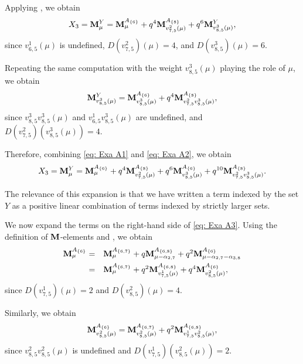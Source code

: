 \begin{example}
    Applying , we obtain
    \begin{equation}\label{eq: Exa A1}
        X_3= \mathbf{M}_{\mu}^{Y} = \mathbf{M}_\mu^{A_{\{6\}}} 
       +q^{4}\mathbf{M}_{v_{7,5}^2(\mu)}^{A_{\{8\}}}
        +q^{6}\mathbf{M}_{v_{8,5}^3 (\mu)}^{Y},
    \end{equation}
    since $v_{6,5}^1(\mu)$ is undefined, $D(v_{7,5}^2)(\mu)=4$, and $D(v_{8,5}^3 )(\mu)=6$. 

    Repeating the same computation with the weight $v_{8,5}^3(\mu)$ playing the role of $\mu$, we obtain
    \begin{equation}\label{eq: Exa A2}
        \mathbf{M}_{v_{8,5}^3(\mu)}^{Y} = \mathbf{M}_{v_{8,5}^3(\mu)}^{A_{\{6\}}} +q^4
        \mathbf{M}_{v_{7,5}^2v_{8,5}^3(\mu)}^{A_{\{8\}}}, 
    \end{equation}
    since $v_{8,5}^3v_{8,5}^3(\mu)$ and $v_{6,5}^1v_{8,5}^3(\mu)$ are undefined, and $D(v_{7,5}^2)(v_{8,5}^3(\mu))=4$.

    Therefore, combining \eqref{eq: Exa A1} and \eqref{eq: Exa A2}, we obtain
    \begin{equation}\label{eq: Exa A3}
        X_3=\mathbf{M}_{\mu}^{Y} = \mathbf{M}_\mu^{A_{\{6\}}} 
       +q^{4}\mathbf{M}_{v_{7,5}^2(\mu)}^{A_{\{8\}}}
        +q^{6}\mathbf{M}_{v_{8,5}^3(\mu)}^{A_{\{6\}}} +q^{10}
        \mathbf{M}_{v_{7,5}^2v_{8,5}^3(\mu)}^{A_{\{8\}}}.
    \end{equation}

The relevance of this expansion is that we have written a term indexed by the set $Y$ as a positive linear combination of terms indexed by strictly larger sets.

We now expand the terms on the right-hand side of \eqref{eq: Exa A3}.
Using the definition of $\mathbf{M}$-elements and , we obtain
\begin{equation} \label{eq: Exa A4}
    \begin{array}{rl}
      \mathbf{M}_{\mu}^{A_{\{6\}}}  = &     \mathbf{M}_{\mu}^{A_{\{6,7\}}} +q     \mathbf{M}_{\mu-\alpha_{2,7}}^{A_{\{6,8\}}} +q^2 \mathbf{M}_{\mu-\alpha_{2,7}-\alpha_{3,8}}^{A_{\{6\}}}   \\[5pt]
       =  &   
       \mathbf{M}_{\mu}^{A_{\{6,7\}}} +q^2     \mathbf{M}_{v_{7,5}^1(\mu)}^{A_{\{6,8\}}} +q^4 \mathbf{M}_{v_{8,5}^2(\mu )}^{A_{\{6\}}}, 
    \end{array}
\end{equation}
since $D(v_{7,5}^1)(\mu)=2$ and $D(v_{8,5}^2)(\mu)=4$. 

Similarly, we obtain
\begin{equation}\label{eq: Exa A5}
    \mathbf{M}_{v_{8,5}^2(\mu )}^{A_{\{6\}}} =  \mathbf{M}_{v_{8,5}^2(\mu )}^{A_{\{6,7\}}}  + q^2  \mathbf{M}_{v_{7,5}^1v_{8,5}^2(\mu )}^{A_{\{6,8\}}},
\end{equation}
since $v_{8,5}^2v_{8,5}^2(\mu )$ is undefined and $D(v_{7,5}^1 )(v_{8,5}^2(\mu ))=2$. 


\end{example}
